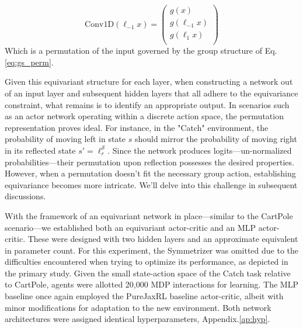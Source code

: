 \begin{equation}\label{eq:perm_gr}
	\text{Conv1D}(\ell_{-1} x) = \begin{pmatrix}
		g(x)          \\
		g(\ell_{-1}x) \\
		g(\ell_{1}x)  \\
	\end{pmatrix}
\end{equation}
Which is a permutation of the input governed by the group structure of Eq.\ref{eq:gs_perm}.

Given this equivariant structure for each layer, when constructing a network out of an input layer and subsequent hidden layers that all adhere to the equivariance constraint, what remains is to identify an appropriate output. In scenarios such as an actor network operating within a discrete action space, the permutation representation proves ideal. For instance, in the "Catch" environment, the probability of moving left in state \( s \) should mirror the probability of moving right in its reflected state \( s' = \ell_r^\mathcal{S} \). Since the network produces logits—un-normalized probabilities—their permutation upon reflection possesses the desired properties. However, when a permutation doesn't fit the necessary group action, establishing equivariance becomes more intricate. We'll delve into this challenge in subsequent discussions.

With the framework of an equivariant network in place—similar to the CartPole scenario—we established both an equivariant actor-critic and an MLP actor-critic. These were designed with two hidden layers and an approximate equivalent in parameter count. For this experiment, the Symmetrizer was omitted due to the difficulties encountered when trying to optimize its performance, as depicted in the primary study. Given the small state-action space of the Catch task relative to CartPole, agents were allotted 20,000 MDP interactions for learning. The MLP baseline once again employed the PureJaxRL baseline actor-critic, albeit with minor modifications for adaptation to the new environment. Both network architectures were assigned identical hyperparameters, Appendix.\ref{ap:hyp}.

